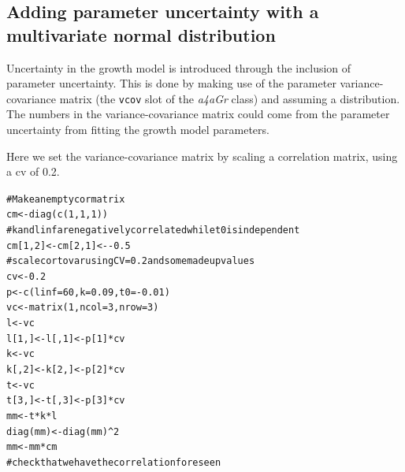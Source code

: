 \documentclass[a4paper,english,10pt]{article}\usepackage[]{graphicx}\usepackage[]{color}
\makeatletter
\newcommand{\hlnum}[1]{\textcolor[rgb]{0.2,0.2,0.2}{#1}}%
\newcommand{\hlcom}[1]{\textcolor[rgb]{0.2,0.267,0.4}{#1}}%
\newcommand{\hlopt}[1]{\textcolor[rgb]{0.2,0.2,0.2}{#1}}%
\newcommand{\hlstd}[1]{\textcolor[rgb]{0,0,0}{#1}}%
\newcommand{\hlkwb}[1]{\textcolor[rgb]{0.361,0.506,0.596}{#1}}%
\newcommand{\hlkwc}[1]{\textcolor[rgb]{0.361,0.506,0.596}{#1}}%
\newcommand{\hlkwd}[1]{\textcolor[rgb]{0.361,0.506,0.596}{#1}}%
\newenvironment{kframe}{%
 \def\at@end@of@kframe{}%
 \ifinner\ifhmode%
  \def\at@end@of@kframe{\end{minipage}}%
  \begin{minipage}{\columnwidth}%
 \fi\fi%
 \def\FrameCommand##1{\hskip\@totalleftmargin \hskip-\fboxsep
 \colorbox{shadecolor}{##1}\hskip-\fboxsep
     \hskip-\linewidth \hskip-\@totalleftmargin \hskip\columnwidth}%
 \MakeFramed {\advance\hsize-\width
   \@totalleftmargin\z@ \linewidth\hsize
   \@setminipage}}%
 {\par\unskip\endMakeFramed%
 \at@end@of@kframe}
\newenvironment{knitrout}{}{} %
\newcommand{\code}[1]{{\texttt{#1}}}
\newcommand{\class}[1]{{\textit{#1}}}
\makeatother
\begin{document}
\subsection{Adding parameter uncertainty with a multivariate normal distribution}

Uncertainty in the growth model is introduced through the inclusion of parameter uncertainty.
This is done by making use of the parameter variance-covariance matrix (the \code{vcov} slot of the \class{a4aGr} class) and assuming a distribution. The numbers in the variance-covariance matrix could come from the parameter uncertainty from fitting the growth model parameters.

Here we set the variance-covariance matrix by scaling a correlation matrix, using a cv of 0.2.

\begin{knitrout}
\color{fgcolor}\begin{kframe}
\begin{alltt}
\hlcom{# Make an empty cor matrix}
\hlstd{cm} \hlkwb{<-} \hlkwd{diag}\hlstd{(}\hlkwd{c}\hlstd{(}\hlnum{1}\hlstd{,} \hlnum{1}\hlstd{,} \hlnum{1}\hlstd{))}
\hlcom{# k and linf are negatively correlated while t0 is independent}
\hlstd{cm[}\hlnum{1}\hlstd{,} \hlnum{2}\hlstd{]} \hlkwb{<-} \hlstd{cm[}\hlnum{2}\hlstd{,} \hlnum{1}\hlstd{]} \hlkwb{<-} \hlopt{-}\hlnum{0.5}
\hlcom{# scale cor to var using CV=0.2 and some made up values}
\hlstd{cv} \hlkwb{<-} \hlnum{0.2}
\hlstd{p} \hlkwb{<-} \hlkwd{c}\hlstd{(}\hlkwc{linf} \hlstd{=} \hlnum{60}\hlstd{,} \hlkwc{k} \hlstd{=} \hlnum{0.09}\hlstd{,} \hlkwc{t0} \hlstd{=} \hlopt{-}\hlnum{0.01}\hlstd{)}
\hlstd{vc} \hlkwb{<-} \hlkwd{matrix}\hlstd{(}\hlnum{1}\hlstd{,} \hlkwc{ncol} \hlstd{=} \hlnum{3}\hlstd{,} \hlkwc{nrow} \hlstd{=} \hlnum{3}\hlstd{)}
\hlstd{l} \hlkwb{<-} \hlstd{vc}
\hlstd{l[}\hlnum{1}\hlstd{, ]} \hlkwb{<-} \hlstd{l[,} \hlnum{1}\hlstd{]} \hlkwb{<-} \hlstd{p[}\hlnum{1}\hlstd{]} \hlopt{*} \hlstd{cv}
\hlstd{k} \hlkwb{<-} \hlstd{vc}
\hlstd{k[,} \hlnum{2}\hlstd{]} \hlkwb{<-} \hlstd{k[}\hlnum{2}\hlstd{, ]} \hlkwb{<-} \hlstd{p[}\hlnum{2}\hlstd{]} \hlopt{*} \hlstd{cv}
\hlstd{t} \hlkwb{<-} \hlstd{vc}
\hlstd{t[}\hlnum{3}\hlstd{, ]} \hlkwb{<-} \hlstd{t[,} \hlnum{3}\hlstd{]} \hlkwb{<-} \hlstd{p[}\hlnum{3}\hlstd{]} \hlopt{*} \hlstd{cv}
\hlstd{mm} \hlkwb{<-} \hlstd{t} \hlopt{*} \hlstd{k} \hlopt{*} \hlstd{l}
\hlkwd{diag}\hlstd{(mm)} \hlkwb{<-} \hlkwd{diag}\hlstd{(mm)}\hlopt{^}\hlnum{2}
\hlstd{mm} \hlkwb{<-} \hlstd{mm} \hlopt{*} \hlstd{cm}
\hlcom{# check that we have the correlation foreseen}

\end{alltt}
\end{kframe}
\end{knitrout}
\end{document}
